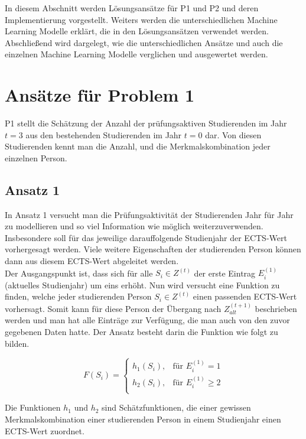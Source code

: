 

In diesem Abschnitt werden L\"osungsans\"atze f\"ur P1 und P2 und deren Implementierung vorgestellt.
Weiters werden die unterschiedlichen Machine Learning Modelle erkl\"art, die in den L\"osungsans\"atzen verwendet werden.
Abschlie{\ss}end wird dargelegt, wie die unterschiedlichen Ans\"atze und auch die einzelnen Machine Learning Modelle
verglichen und ausgewertet werden.


\section{Ans\"atze f\"ur Problem 1}
P1 stellt die Sch\"atzung der Anzahl der pr\"ufungsaktiven Studierenden im Jahr $t = 3$ aus den bestehenden Studierenden im Jahr $t = 0$ dar.
Von diesen Studierenden kennt man die Anzahl, und die Merkmalskombination jeder einzelnen Person.

\subsection{Ansatz 1}
\label{sec:appr1}
In Ansatz 1 versucht man die Pr\"ufungsaktivit\"at der Studierenden Jahr f\"ur Jahr zu modellieren und so viel Information wie m\"oglich weiterzuverwenden.
Insbesondere soll f\"ur das jeweilige darauffolgende Studienjahr der ECTS-Wert vorhergesagt werden. Viele weitere Eigenschaften der studierenden Person
k\"onnen dann aus diesem ECTS-Wert abgeleitet werden. \\

Der Ausgangspunkt ist, dass sich für alle $S_i \in Z^{(t)}$ der erste Eintrag $E_i^{(1)}$ (aktuelles Studienjahr) um eins erhöht.
Nun wird versucht eine Funktion zu finden, welche jeder studierenden Person $S_i \in Z^{(t)}$ einen passenden ECTS-Wert vorhersagt.
Somit kann f\"ur diese Person der \"Ubergang nach $Z_{alt}^{(t+1)}$ beschrieben werden und man hat alle Eintr\"age zur Verf\"ugung, die
man auch von den zuvor gegebenen Daten hatte. Der Ansatz besteht darin die Funktion wie folgt zu bilden.

$$
  F(S_i)=
  \left\{
  \begin{array}{lr}
    h_1(S_i), & \text{für }E_i^{(1)} = 1    \\
    h_2(S_i), & \text{für }E_i^{(1)} \geq 2 \\
  \end{array}
  \right.
$$

Die Funktionen $h_1$ und $h_2$ sind Sch\"atzfunktionen, die einer gewissen Merkmalskombination einer studierenden Person in einem Studienjahr einen
ECTS-Wert zuordnet. \\

